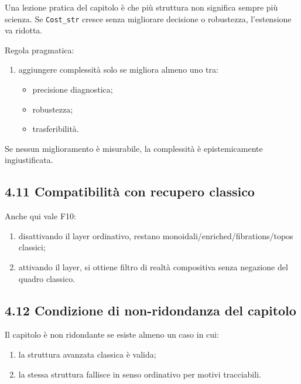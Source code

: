 Una lezione pratica del capitolo è che più struttura non significa sempre più scienza. Se \texttt{Cost\_str} cresce senza migliorare decisione o robustezza, l'estensione va ridotta.

Regola pragmatica:

\begin{enumerate}
\def\labelenumi{\arabic{enumi}.}
\tightlist
\item
  aggiungere complessità solo se migliora almeno uno tra:

  \begin{itemize}
  \tightlist
  \item
    precisione diagnostica;
  \item
    robustezza;
  \item
    trasferibilità.
  \end{itemize}
\end{enumerate}

Se nessun miglioramento è misurabile, la complessità è epistemicamente ingiustificata.

\subsection{4.11 Compatibilità con recupero classico}

Anche qui vale F10:

\begin{enumerate}
\def\labelenumi{\arabic{enumi}.}
\tightlist
\item
  disattivando il layer ordinativo, restano monoidali/enriched/fibrations/topos classici;
\item
  attivando il layer, si ottiene filtro di realtà compositiva senza negazione del quadro classico.
\end{enumerate}

\subsection{4.12 Condizione di non-ridondanza del capitolo}

Il capitolo è non ridondante se esiste almeno un caso in cui:

\begin{enumerate}
\def\labelenumi{\arabic{enumi}.}
\tightlist
\item
  la struttura avanzata classica è valida;
\item
  la stessa struttura fallisce in senso ordinativo per motivi tracciabili.
\end{enumerate}

